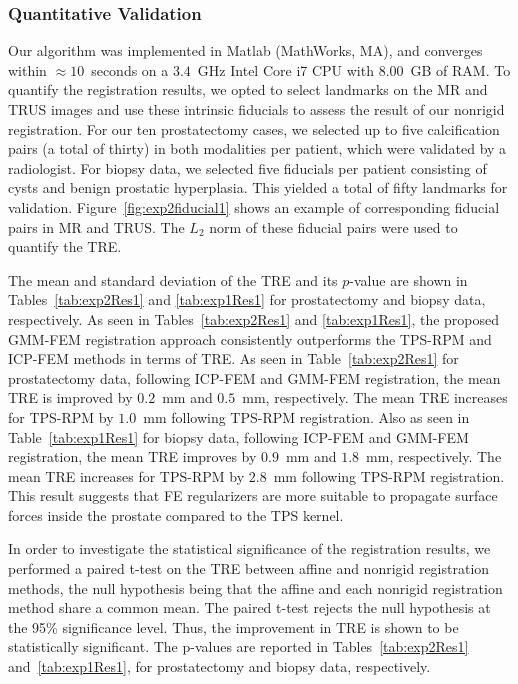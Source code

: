 \documentclass[journal]{IEEEtran}
\begin{document}
\subsubsection{Quantitative Validation}
Our algorithm was implemented in Matlab (MathWorks, MA), and converges within $\approx10$~seconds on a $3.4$~GHz Intel Core i7 CPU with $8.00$~GB of RAM. To quantify the registration results, we opted to select landmarks on the MR and TRUS images and use these intrinsic fiducials to assess the result of our nonrigid registration. For our ten prostatectomy cases, we selected up to five calcification pairs (a total of thirty) in both modalities per patient, which were validated by a radiologist. For biopsy data, we selected five fiducials per patient consisting of cysts and benign prostatic hyperplasia. This yielded a total of fifty landmarks for validation. Figure~\ref{fig:exp2fiducial1} shows an example of corresponding fiducial pairs in MR and TRUS. The $L_2$ norm of these fiducial pairs were used to quantify the TRE. 

The mean and standard deviation of the TRE and its $p$-value are shown in Tables~\ref{tab:exp2Res1} and \ref{tab:exp1Res1} for prostatectomy and biopsy data, respectively. As seen in Tables~\ref{tab:exp2Res1} and \ref{tab:exp1Res1}, the proposed GMM-FEM registration approach consistently outperforms the TPS-RPM and ICP-FEM methods in terms of TRE. As seen in Table~\ref{tab:exp2Res1} for prostatectomy data, following ICP-FEM and GMM-FEM registration, the mean TRE is improved by $0.2$~mm and $0.5$~mm, respectively. The mean TRE increases for TPS-RPM by $1.0$~mm following TPS-RPM registration. Also as seen in Table~\ref{tab:exp1Res1} for biopsy data, following ICP-FEM and GMM-FEM registration, the mean TRE improves by $0.9$~mm and $1.8$~mm, respectively. The mean TRE increases for TPS-RPM by $2.8$~mm following TPS-RPM registration. This result suggests that FE regularizers are more suitable to propagate surface forces inside the prostate compared to the TPS kernel.

In order to investigate the statistical significance of the registration results, we performed a paired t-test on the TRE between affine and nonrigid registration methods, the null hypothesis being that the affine and each nonrigid registration method share a common mean. The paired t-test rejects the null hypothesis at the 95\% significance level. Thus, the improvement in TRE is shown to be statistically significant.  The p-values are reported in Tables~\ref{tab:exp2Res1} and~\ref{tab:exp1Res1}, for prostatectomy and biopsy data, respectively. 
\end{document}
